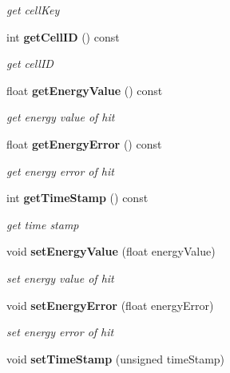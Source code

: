 \begin{DoxyCompactItemize}
\begin{DoxyCompactList}\small\item\em get cell\-Key \end{DoxyCompactList}\item 
int {\bf get\-Cell\-I\-D} () const \label{classCALICE_1_1TcmtHit_a79ef589b9f3790e668d08166b247e120}

\begin{DoxyCompactList}\small\item\em get cell\-I\-D \end{DoxyCompactList}\item 
float {\bf get\-Energy\-Value} () const \label{classCALICE_1_1TcmtHit_a9b11690c240caed823bbdd2daea1652e}

\begin{DoxyCompactList}\small\item\em get energy value of hit \end{DoxyCompactList}\item 
float {\bf get\-Energy\-Error} () const \label{classCALICE_1_1TcmtHit_a04e6e33a6a5bedd924d6f4bee389d7c4}

\begin{DoxyCompactList}\small\item\em get energy error of hit \end{DoxyCompactList}\item 
int {\bf get\-Time\-Stamp} () const \label{classCALICE_1_1TcmtHit_a7e01c36b8b02e069b24c0592b0710d88}

\begin{DoxyCompactList}\small\item\em get time stamp \end{DoxyCompactList}\item 
void {\bf set\-Energy\-Value} (float energy\-Value)\label{classCALICE_1_1TcmtHit_a9e1a69cc5e1c5387c20f584e75a708b8}

\begin{DoxyCompactList}\small\item\em set energy value of hit \end{DoxyCompactList}\item 
void {\bf set\-Energy\-Error} (float energy\-Error)\label{classCALICE_1_1TcmtHit_a4e7dc7885f661827c0df8b50724c9be3}

\begin{DoxyCompactList}\small\item\em set energy error of hit \end{DoxyCompactList}\item 
void {\bf set\-Time\-Stamp} (unsigned time\-Stamp)\label{classCALICE_1_1TcmtHit_a530792c19fdd0f5aa5b788e1b5ae6043}


\end{DoxyCompactItemize}
